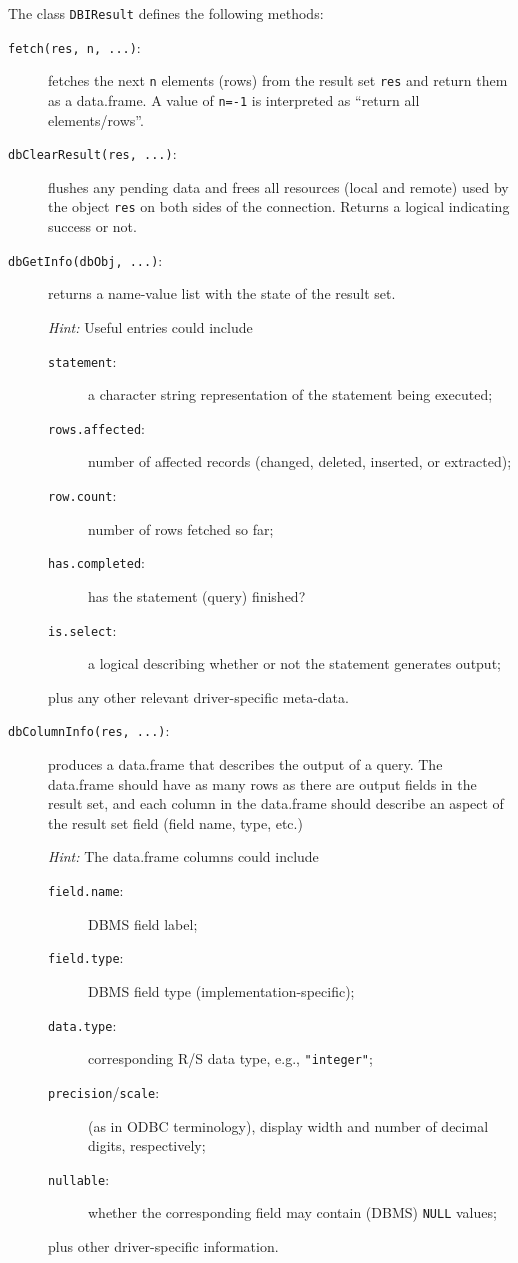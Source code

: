 \documentclass[graphics,times,psfig,dvips,hyper]{article}
\newcommand{\sobj}[1]{\mbox{\tt #1}}    %
\newcommand{\sexp}[1]{\mbox{\tt #1}}    %
\newcommand{\sclass}[1]{\mbox{\tt #1}}  %
\newcommand{\smethod}[1]{\mbox{\tt #1}} %
\begin{document}
The class \sclass{DBIResult} defines the following methods:
\begin{description}
\item[\smethod{fetch(res, n, ...)}:]\label{meth:fetch}
  fetches the next \sobj{n} elements (rows) from the result set
  \sobj{res} and return them as a data.frame.  A value of \sexp{n=-1}
  is interpreted as ``return all elements/rows''.

\item[\smethod{dbClearResult(res, ...)}:]
  flushes any pending data and frees all resources (local and
  remote) used by the object \sobj{res} on both sides of the
  connection. Returns a logical indicating success or not.

\item[\smethod{dbGetInfo(dbObj, ...)}:]
   returns a name-value list with the state of the result set.

   \emph{Hint:} Useful entries could include
   \begin{description}
   \item[\sobj{statement}:] a character string representation of the
   statement being executed;
   \item[\sobj{rows.affected}:] number of affected records (changed, 
   deleted, inserted, or extracted);
   \item[\sobj{row.count}:] number of rows fetched so far;
   \item[\sobj{has.completed}:] has the statement (query) finished?
   \item[\sobj{is.select}:] a logical describing whether or not the
   statement generates output;
   \end{description}
   plus any other relevant driver-specific meta-data.

\item[\smethod{dbColumnInfo(res, ...)}:]
   produces a data.frame that describes the output of a query. 
   The data.frame should have as many rows as there are output
   fields in the result set, and each column in the data.frame
   should describe an aspect of the result set field (field name,
   type, etc.)
 
   \emph{Hint:} The data.frame columns could include 
   \begin{description}
   \item[\sobj{field.name}:] DBMS field label;
   \item[\sobj{field.type}:] DBMS field type (implementation-specific);
   \item[\sobj{data.type}:] corresponding R/S data type, e.g., 
   \sexp{"integer"};
   \item[\sobj{precision}/\sobj{scale}:] (as in ODBC terminology),  
   display width and number of decimal digits, respectively;
   \item[\sobj{nullable}:] whether the corresponding field may contain
   (DBMS) \texttt{NULL} values;
   \end{description}
   plus other driver-specific information.


\end{description}
\end{document}

